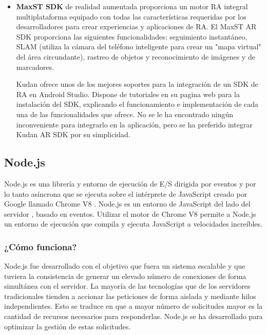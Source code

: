 \begin{itemize}
    \item  \textbf{MaxST SDK} \cite{URL::maxst} de realidad aumentada proporciona un motor RA integral multiplataforma equipado con todas las características requeridas por los desarrolladores para crear experiencias y aplicaciones de RA. El MaxST AR SDK proporciona las siguientes funcionalidades: seguimiento instantáneo, SLAM \cite{URL::SLAM} (utiliza la cámara del teléfono inteligente para crear un "mapa virtual" del área circundante), rastreo de objetos y reconocimiento de imágenes y de marcadores.
    
    Kudan ofrece unos de los mejores soportes para la integración de un SDK de RA en Android Studio. Dispone de  tutoriales en su pagina web para la instalación del SDK, explicando el funcionamiento e implementación de cada una de las funcionalidades que ofrece. No se le ha encontrado ningún inconveniente para integrarlo en la aplicación, pero se ha preferido integrar Kudan AR SDK por su simplicidad.
\end{itemize}



\subsection{Node.js}

Node.js \cite{URL::Nodejs} es una librería y entorno de ejecución de E/S dirigida por eventos y por lo tanto asíncrona que se ejecuta sobre el intérprete de JavaScript creado por Google llamado Chrome V8 \cite{URL::ChromeV8}. Node.js es un entorno de JavaScript del lado del servidor \cite{URL::serverside}, basado en eventos. Utilizar el motor de Chrome V8 permite a Node.js un entorno de ejecución que compila y ejecuta JavaScript a velocidades increíbles.

\subsubsection{¿Cómo funciona?}

Node.js fue desarrollado con el objetivo que fuera un sistema escalable y que tuviera la consistencia de generar un elevado número de conexiones de forma simultánea con el servidor. La mayoría de las tecnologías que de los servidores tradicionales tienden a accionar las peticiones de forma aislada y mediante hilos independientes. Esto se traduce en que a mayor número de solicitudes mayor es la cantidad de recursos necesarios para responderlas. Node.js se ha desarrollado para optimizar la gestión de estas solicitudes.

